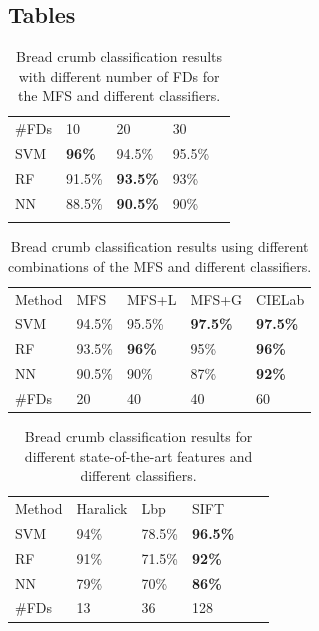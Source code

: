 \documentclass[twocolumn]{bmcart}%
\begin{document}
\begin{backmatter}
\section*{Tables}
\begin{table}[h!]
\caption{Bread crumb classification results with different number of FDs for the MFS and different classifiers.}
\label{tab:number}       %
\begin{tabular}{lllll}
\hline\noalign{\smallskip}
\#FDs & 10  & 20 & 30 \\
\noalign{\smallskip}\hline\noalign{\smallskip}
SVM & \textbf{96\%} & 94.5\% & 95.5\% \\
RF  & 91.5\% & \textbf{93.5\%} & 93\% \\
NN & 88.5\% & \textbf{90.5\%} & 90\% \\
\noalign{\smallskip}\hline
\end{tabular}
\end{table}


\begin{table}[h!]
\caption{Bread crumb classification results using different combinations of the MFS and different classifiers.}
\label{tab:mfs}       %
\begin{tabular}{lllll}
\hline\noalign{\smallskip}
Method & MFS & MFS+L & MFS+G & CIELab  \\
\noalign{\smallskip}\hline\noalign{\smallskip}
SVM & 94.5\% & 95.5\% & \textbf{97.5\%} & \textbf{97.5\%} \\
RF  & 93.5\% & \textbf{96\%} & 95\% & \textbf{96\%} \\
NN & 90.5\% & 90\% & 87\% & \textbf{92\%} \\
\noalign{\smallskip}\hline
\#FDs & 20 & 40 & 40 & 60 \\
\hline
\end{tabular}
\end{table}

\begin{table}[h!]
\caption{Bread crumb classification results for different state-of-the-art features and different classifiers.}
\label{tab:other}       %
\begin{tabular}{llllll}
\hline\noalign{\smallskip}
Method & Haralick & Lbp & SIFT\\ %
\noalign{\smallskip}\hline\noalign{\smallskip}
SVM & 94\% & 78.5\% & \textbf{96.5\%} \\ %
RF  & 91\% & 71.5\% & \textbf{92\%} \\ %
NN & 79\% & 70\% & \textbf{86\%} \\ %
\noalign{\smallskip}\hline
\#FDs & 13 & 36 & 128 \\
\hline
\end{tabular}
\end{table}


\end{backmatter}
\end{document}
